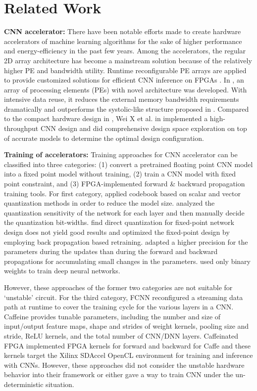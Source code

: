 \section{Related Work} \label{sec:relatedwork}
\textbf{CNN accelerator:} There have been notable efforts made to create hardware accelerators of 
machine learning algorithms for the sake of higher performance and energy-efficiency \cite{Cnvlutin_25} 
in the past few years. Among the accelerators, the regular 2D array architecture has become 
a mainstream solution because of the relatively higher PE and bandwidth utility. Runtime reconfigurable 
PE arrays are applied to provide customized solutions for efficient CNN inference on FPGAs \cite{Caffeine_6,deepburing_12}. 
In \cite{Aydonat_27}, an array of processing elements (PEs) with novel architecture was developed. With intensive 
data reuse, it reduces the external memory bandwidth requirements dramatically and outperforms 
the systolic-like structure proposed in \cite{Caffeine_6}. Compared to the compact hardware design in \cite{Caffeine_6,Aydonat_27}, 
Wei X et al. in \cite{Wei_29} implemented a high-throughput CNN design and did comprehensive design space exploration 
on top of accurate models to determine the optimal design configuration.

\textbf{Training of accelerators:} Training approaches for CNN accelerator can be classified into three 
categories: (1) convert a pretrained floating point CNN model into a fixed point model without 
training, (2) train a CNN model with fixed point constraint, and (3) FPGA-implemented forward \& backward propagation 
training tools. For first category, \cite{Yunchao_19} applied codebook based on scalar and vector quantization methods 
in order to reduce the model size. \cite{Cnvlutin_25} analyzed the quantization sensitivity of the network for each layer 
and then manually decide the quantization bit-widths. \cite{Hwang2014_17} find direct quantization for fixed-point 
network design does not yield good results and optimized the fixed-point design by employing back propagation 
based retraining. \cite{Matthieu2014_8} adapted a higher precision for the parameters during the updates than during 
the forward and backward propagations for accumulating small changes in the parameters. \cite{Hwang2014_17} used only binary 
weights to train deep neural networks. 

  However, these approaches of the former two categories are not suitable for ‘unstable’ circuit. 
For the third category, FCNN\cite{fcnn_5}  reconfigured a streaming data path at runtime to cover the training cycle 
for the various layers in a CNN. Caffeine\cite{Caffeine_6}  provides tunable parameters, including the number and 
size of input/output feature maps, shape and strides of weight kernels, pooling size and stride, 
ReLU kernels, and the total number of CNN/DNN layers. Caffeinated FPGA\cite{DiCecco_4} implemented FPGA kernels 
for forward and backward for Caffe and these kernels target the Xilinx SDAccel OpenCL environment 
for training and inference with CNNs. However, these approaches did not consider the unstable 
hardware behavior into their framework or either gave a way to train CNN under the un-deterministic situation.

